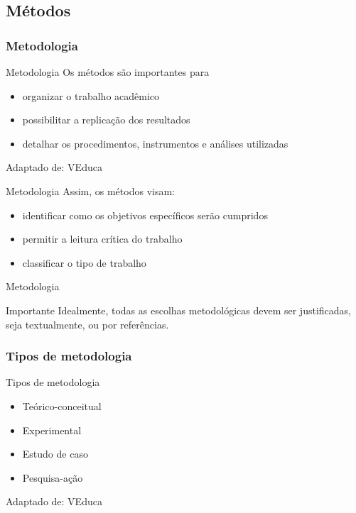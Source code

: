\documentclass{beamer}
\begin{document}
\subsection{Métodos}

\subsubsection{Metodologia}

\begin{frame}{Metodologia}
  \footnotesize
  Os métodos são importantes para
  \begin{itemize}
    \footnotesize
  \item organizar o trabalho acadêmico
  \item possibilitar a replicação dos resultados
  \item detalhar os procedimentos, instrumentos e análises utilizadas
  \end{itemize}

  \vfill
  \scriptsize
  Adaptado de: VEduca
\end{frame}

\begin{frame}{Metodologia}
  \footnotesize
  Assim, os métodos visam:
  \begin{itemize}
    \footnotesize
  \item identificar como os objetivos específicos serão cumpridos
  \item permitir a leitura crítica do trabalho
  \item classificar o tipo de trabalho
  \end{itemize}
\end{frame}

\begin{frame}{Metodologia}
  \begin{block}{Importante}
    \footnotesize
    Idealmente, todas as escolhas metodológicas devem ser
    justificadas, seja textualmente, ou por referências.
  \end{block}
\end{frame}

\subsubsection{Tipos de metodologia}

\begin{frame}{Tipos de metodologia}
  \begin{itemize}
    \footnotesize
  \item<1-> Teórico-conceitual
  \item<1-> Experimental
  \item<1-> Estudo de caso
  \item<1-> Pesquisa-ação
  \end{itemize}

  \vfill
  \scriptsize
  Adaptado de: VEduca
\end{frame}
\end{document}

